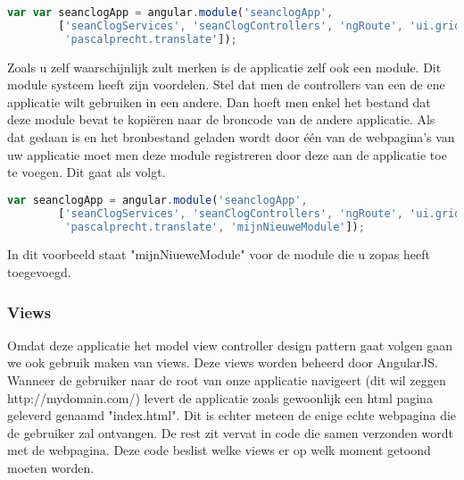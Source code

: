 \documentclass[a4paper,11pt]{article}
\begin{document}
\begin{lstlisting}[language=javascript]
var var seanclogApp = angular.module('seanclogApp',
		['seanClogServices', 'seanClogControllers', 'ngRoute', 'ui.grid',
		 'pascalprecht.translate']);
\end{lstlisting}

Zoals u zelf waarschijnlijk zult merken is de applicatie zelf ook een module. Dit module systeem heeft zijn voordelen. Stel dat men de controllers van een de ene applicatie wilt gebruiken in een andere. Dan hoeft men enkel het bestand dat deze module bevat te kopiëren naar de broncode van de andere applicatie. Als dat gedaan is en het bronbestand geladen wordt door één van de webpagina's van uw applicatie moet men deze module registreren door deze aan de applicatie toe te voegen. Dit gaat als volgt.

\begin{lstlisting}[language=javascript]
var seanclogApp = angular.module('seanclogApp',
		['seanClogServices', 'seanClogControllers', 'ngRoute', 'ui.grid',
		 'pascalprecht.translate', 'mijnNieuweModule']);
\end{lstlisting}

In dit voorbeeld staat "mijnNiueweModule" voor de module die u zopas heeft toegevoegd.

\subsubsection{Views}
Omdat deze applicatie het model view controller design pattern gaat volgen gaan we ook gebruik maken van views. Deze views worden beheerd door AngularJS. Wanneer de gebruiker naar de root van onze applicatie navigeert (dit wil zeggen http://mydomain.com/) levert de applicatie zoals gewoonlijk een html pagina geleverd genaamd "index.html". Dit is echter meteen de enige echte webpagina die de gebruiker zal ontvangen. De rest zit vervat in code die samen verzonden wordt met de webpagina. Deze code beslist welke views er op welk moment getoond moeten worden.
\end{document}
